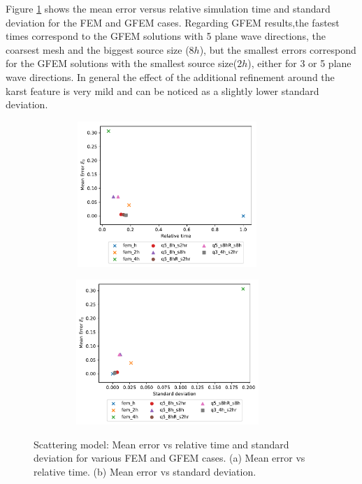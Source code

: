 \clearpage
Figure \ref{fig:3.36} shows the mean error versus relative simulation time and standard deviation for the FEM and GFEM cases. Regarding GFEM results,the fastest times correspond to the GFEM solutions with 5 plane wave directions, the coarsest mesh and the biggest source size ($8h$), but the smallest errors correspond for the GFEM solutions with the smallest source size($2h$), either for 3 or 5 plane wave directions. In general the effect of the additional refinement around the karst feature is very mild and can be noticed as a slightly lower standard deviation. 

 \begin{figure}[h!]
 		\centering
		\begin{subfigure}{8cm}
				\includegraphics[width=8cm, height=5.5cm]{Thesis_Edith/figures/scattering/scat_waves/MeanError_time_scat.pdf}
			     \caption{}
		\end{subfigure}
        \hspace{0.25cm}	
		\begin{subfigure}{8cm}
				\includegraphics[width=8cm, height=5.5cm]{Thesis_Edith/figures/scattering/scat_waves/MeanError_std_scat.pdf}
			   \caption{}
		\end{subfigure}
 
	\caption{Scattering model: Mean error vs relative time and standard deviation for various FEM and GFEM cases. (a) Mean error vs relative time. (b) Mean error vs standard deviation. }
	\label{fig:3.36}
\end{figure}

